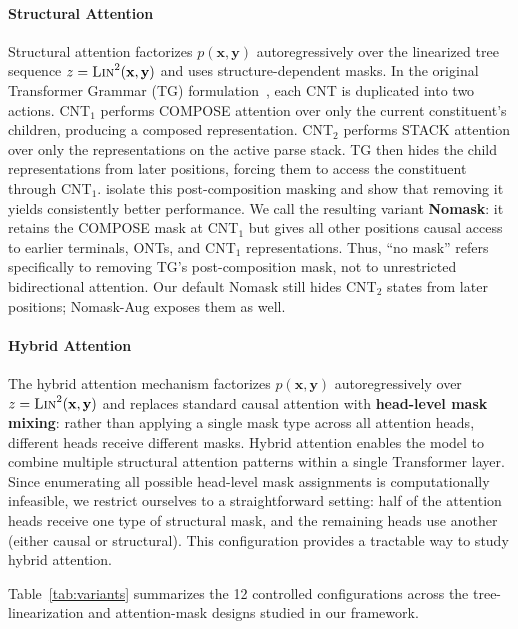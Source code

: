 \documentclass[11pt]{article}
\begin{document}
\paragraph{Structural Attention}
Structural attention factorizes $p(\mathbf{x}, \mathbf{y})$ autoregressively over the linearized tree sequence $z = \textsc{Lin}^2(\mathbf{x}, \mathbf{y})$ and uses structure-dependent masks. In the original Transformer Grammar (TG) formulation~\cite{sartran-etal-2022-transformer}, each CNT is duplicated into two actions. CNT$_1$ performs \textsc{COMPOSE} attention over only the current constituent's children, producing a composed representation. CNT$_2$ performs \textsc{STACK} attention over only the representations on the active parse stack. TG then hides the child representations from later positions, forcing them to access the constituent through CNT$_1$. \citet{zhao-etal-2025-systematic} isolate this post-composition masking and show that removing it yields consistently better performance. We call the resulting variant \textbf{Nomask}: it retains the \textsc{COMPOSE} mask at CNT$_1$ but gives all other positions causal access to earlier terminals, ONTs, and CNT$_1$ representations. Thus, ``no mask'' refers specifically to removing TG's post-composition mask, not to unrestricted bidirectional attention. Our default Nomask still hides CNT$_2$ states from later positions; Nomask-Aug exposes them as well.

\paragraph{Hybrid Attention} The hybrid attention mechanism factorizes $p(\mathbf{x}, \mathbf{y})$ autoregressively over $z = \textsc{Lin}^2(\mathbf{x}, \mathbf{y})$ and replaces standard causal attention with \textbf{head-level mask mixing}: rather than applying a single mask type across all attention heads, different heads receive different masks. Hybrid attention enables the model to combine multiple structural attention patterns within a single Transformer layer.
Since enumerating all possible head-level mask assignments is computationally infeasible, we restrict ourselves to a straightforward setting: half of the attention heads receive one type of structural mask, and the remaining heads use another (either causal or structural). This configuration provides a tractable way to study hybrid attention.

Table~\ref{tab:variants} summarizes the 12 controlled configurations across the tree-linearization and attention-mask designs studied in our framework.
\end{document}
